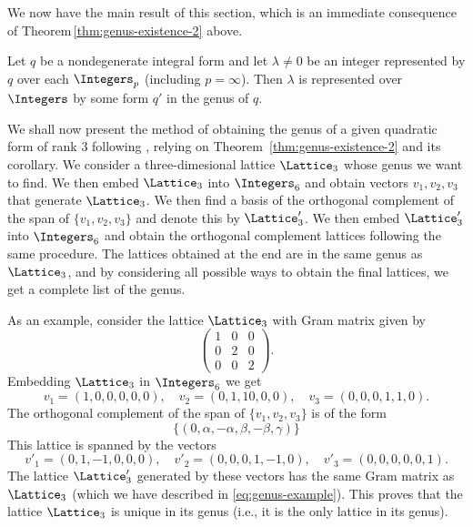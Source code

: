 We now have the main result of this section, which is an immediate consequence
of Theorem\,\ref{thm:genus-existence-2} above.

\begin{corollary}
    Let \(q\) be a nondegenerate integral form and let \(\lambda \neq 0\) be an
    integer represented by \(q\) over each \(\Integers_p\) (including \(p =
    \infty\)). Then \(\lambda\) is represented over \(\Integers\) by some form
    \(q'\) in the genus of \(q\).
\end{corollary}

We shall now present the method of obtaining the genus of a given quadratic form
of rank \(3\) following \cite[pp.~9--0]{moon2008universal}, relying on
Theorem~\ref{thm:genus-existence-2} and its corollary. We consider a
three-dimesional lattice \(\Lattice_3\) whose genus we want to find. We then
embed \(\Lattice_3\) into \(\Integers_6\) and obtain vectors \(v_1, v_2, v_3\)
that generate \(\Lattice_3\). We then find a basis of the orthogonal complement
of the span of \(\{v_1, v_2, v_3\}\) and denote this by \(\Lattice'_3\). We then
embed \(\Lattice'_3\) into \(\Integers_6\) and obtain the orthogonal complement
lattices following the same procedure. The lattices obtained at the end are in
the same genus as \(\Lattice_3\), and by considering all possible ways to obtain
the final lattices, we get a complete list of the genus.

As an example, consider the lattice \(\Lattice_3\) with Gram matrix given by
\begin{equation}
    \label{eq:genus-example}
    \begin{pmatrix}
        1 & 0 & 0\\
        0 & 2 & 0\\
        0 & 0 & 2
    \end{pmatrix}.
\end{equation}
Embedding \(\Lattice_3\) in \(\Integers_6\) we get
\[
    v_1 = (1, 0, 0, 0, 0, 0), \quad v_2 = (0, 1, 1 0, 0, 0),
    \quad v_3 = (0, 0, 0, 1, 1, 0).
\]
The orthogonal complement of the span of \(\{v_1, v_2, v_3\}\) is of the form
\[
    \{(0, \alpha, -\alpha, \beta, -\beta, \gamma)\}
\]
This lattice is spanned by the vectors
\[
    v'_1 = (0, 1, -1, 0, 0, 0), \quad v'_2 = (0, 0, 0, 1, -1, 0),
    \quad v'_3 = (0, 0, 0, 0, 0, 1).
\]
The lattice \(\Lattice'_3\) generated by these vectors has the same Gram matrix
as \(\Lattice_3\) (which we have described in \eqref{eq:genus-example}). This
proves that the lattice \(\Lattice_3\) is unique in its genus (i.e., it is the
only lattice in its genus).

